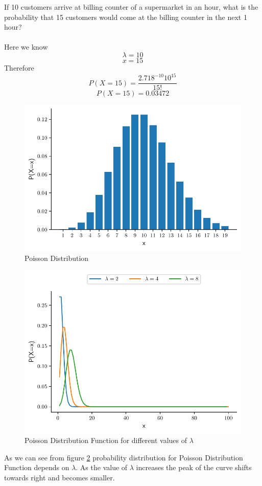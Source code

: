 \documentclass[twoside,12pt]{report}  %
\begin{document}
\begin{tcolorbox}[colback=blue!5!white, colframe=blue!75!black, title = \textbf{Poisson Distribution Function}]
	If 10 customers arrive at billing counter of a supermarket in an hour, what is the probability that 15 customers would come at the billing counter in the next 1 hour?
	\\
	\\
	Here we know
	$$ \lambda = 10 $$
	$$ x = 15 $$
	Therefore
	$$ P(X=15) = \frac{2.718^{-10} 10^{15}}{15!} $$
	$$ P(X=15) = 0.03472 $$	
	
	\begin{figure}[H]
		\centering
		\includegraphics[width=0.5\linewidth]{./images/poission_example.pdf}
		\caption{Poisson Distribution}
		\label{figure_poission_example}
	\end{figure}

\end{tcolorbox}

\vfill
\pagebreak

\begin{figure}[H]
	\centering
	\includegraphics[width=0.5\linewidth]{./images/poission_example_u.pdf}
	\caption{Poisson Distribution Function for different values of $\lambda$}
	\label{figure_poission_example_u}
\end{figure}
\noindent
As we can see from figure \ref{figure_poission_example_u} probability distribution for Poisson Distribution Function depends on $\lambda$. As the value of $\lambda$ increases the peak of the curve shifts towards right and becomes smaller.
\end{document}
